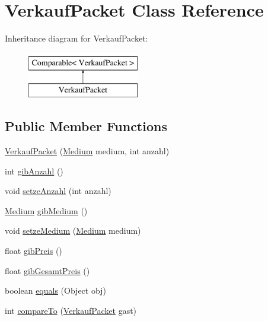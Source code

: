 \hypertarget{classVerkaufPacket}{\section{Verkauf\-Packet Class Reference}
\label{classVerkaufPacket}
}
Inheritance diagram for Verkauf\-Packet\-:\begin{figure}[H]
\begin{center}
\leavevmode
\includegraphics[height=2.000000cm]{classVerkaufPacket}
\end{center}
\end{figure}
\subsection*{Public Member Functions}
\begin{DoxyCompactItemize}
\item 
\hyperlink{classVerkaufPacket_a3386da111f7c9f1dfcc30911b0d7a33b}{Verkauf\-Packet} (\hyperlink{classMedium}{Medium} medium, int anzahl)
\item 
int \hyperlink{classVerkaufPacket_a6abe59e3f891d2b62b52ee61a4264325}{gib\-Anzahl} ()
\item 
void \hyperlink{classVerkaufPacket_a61f352d1a9bfd77eaf51176af334af7a}{setze\-Anzahl} (int anzahl)
\item 
\hyperlink{classMedium}{Medium} \hyperlink{classVerkaufPacket_a22d6fae8a2cbd3dbb7b258bf24d9e99d}{gib\-Medium} ()
\item 
void \hyperlink{classVerkaufPacket_a2ccb495d227ec9da75b80e53bcf0cc72}{setze\-Medium} (\hyperlink{classMedium}{Medium} medium)
\item 
float \hyperlink{classVerkaufPacket_a27dc0ed95b66b8fb573f9f1ebddc564e}{gib\-Preis} ()
\item 
float \hyperlink{classVerkaufPacket_a2f1e53843d2552c1d0a8dc4558758c87}{gib\-Gesamt\-Preis} ()
\item 
boolean \hyperlink{classVerkaufPacket_adbe07c2a07ed9a1ed511b34da6279601}{equals} (Object obj)
\item 
int \hyperlink{classVerkaufPacket_a2a0a506d856443a33ed3b2b5d25ba2bb}{compare\-To} (\hyperlink{classVerkaufPacket}{Verkauf\-Packet} gast)
\end{DoxyCompactItemize}


